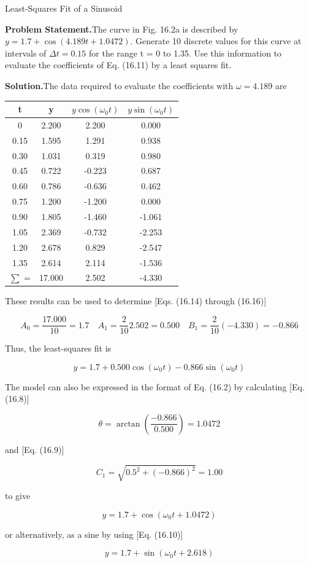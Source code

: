 \documentclass[../main.tex]{subfiles}
\begin{document}
\begin{example} Least-Squares Fit of a Sinusoid

    \noindent\textbf{Problem Statement.}\quad The curve in Fig. 16.2a is described by $y = 1.7 + \cos(4.189t + 1.0472)$. Generate 10 discrete values for this curve at intervals of $\Delta t = 0.15$ for the range
	t = 0 to 1.35. Use this information to evaluate the coefficients of Eq. (16.11) by a least squares fit.

    \noindent\textbf{Solution.}\quad  The data required to evaluate the coefficients with $\omega = 4.189$ are

	\noindent
	\begin{tabular}{c c c c}
		\textbf{t} & \textbf{y} & \textbf{$y \cos(\omega_0 t)$} & \textbf{$y \sin(\omega_0 t)$} \\
		\hline
		0 & 2.200 & 2.200 & 0.000 \\
		0.15 & 1.595 & 1.291 & 0.938 \\
		0.30 & 1.031 & 0.319 & 0.980 \\
		0.45 & 0.722 & -0.223 & 0.687 \\
		0.60 & 0.786 & -0.636 & 0.462 \\
		0.75 & 1.200 & -1.200 & 0.000 \\
		0.90 & 1.805 & -1.460 & -1.061 \\
		1.05 & 2.369 & -0.732 & -2.253 \\
		1.20 & 2.678 & 0.829 & -2.547 \\
		1.35 & 2.614 & 2.114 & -1.536 \\
		\hline
		$\sum$ = & 17.000 & 2.502 & -4.330
	\end{tabular}

	\noindent These results can be used to determine [Eqs. (16.14) through (16.16)]

	$$
		A_0 = \frac{17.000}{10} = 1.7	\quad A_1 = \frac{2}{10} 2.502 = 0.500 \quad B_1 = \frac{2}{10} (-4.330) = -0.866
	$$

	\noindent Thus, the least-squares fit is

	$$
		y = 1.7 + 0.500 \cos(\omega_0 t) - 0.866 \sin(\omega_0 t)
	$$

	\noindent The model can also be expressed in the format of Eq. (16.2) by calculating [Eq. (16.8)]

	$$
		\theta = \arctan (\frac{-0.866}{0.500}) = 1.0472
	$$

	\noindent and [Eq. (16.9)]

	$$
		C_1 = \sqrt{0.5^2 + (-0.866)^2} = 1.00
	$$

	\noindent to give 

	$$
		y = 1.7 + \cos(\omega_0 t + 1.0472)
	$$

	\noindent or alternatively, as a sine by using [Eq. (16.10)]

	$$
		y = 1.7 + \sin (\omega_0 t + 2.618)
	$$
\end{example}
\end{document}
